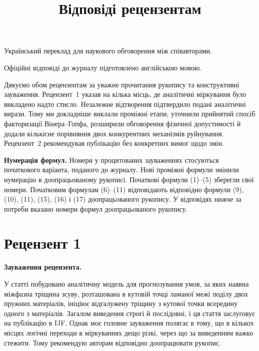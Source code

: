 \documentclass[11pt]{article}
\author{}
\date{}
\newenvironment{reviewcomment}{\def\FrameCommand{\textcolor{blue!45!black}{\vrule width 1.2pt}\hspace{9pt}}\MakeFramed{\advance\hsize-\width\FrameRestore}\noindent\textbf{Зауваження рецензента.}\par\smallskip\noindent}{\endMakeFramed}
\begin{document}
\title{Відповіді рецензентам}
\maketitle
\vspace{-2em}
\begin{center}
Український переклад для наукового обговорення між співавторами.\par
Офіційні відповіді до журналу підготовлено англійською мовою.
\end{center}
\bigskip

Дякуємо обом рецензентам за уважне прочитання рукопису та конструктивні зауваження. Рецензент~1 указав на кілька місць, де аналітичні міркування було викладено надто стисло. Незалежне відтворення підтвердило подані аналітичні вирази. Тому ми докладніше виклали проміжні етапи, уточнили прийнятий спосіб факторизації Вінера--Гопфа, розширили обговорення фізичної допустимості й додали кількісне порівняння двох конкурентних механізмів руйнування. Рецензент~2 рекомендував публікацію без конкретних вимог щодо змін.

\textbf{Нумерація формул.} Номери у процитованих зауваженнях стосуються початкового варіанта, поданого до журналу. Нові проміжні формули змінили нумерацію в доопрацьованому рукописі. Початкові формули (1)–(5) зберегли свої номери. Початковим формулам (6)–(11) відповідають відповідно формули (9), (10), (11), (15), (16) і (17) доопрацьованого рукопису. У відповідях нижче за потреби вказано номери формул доопрацьованого рукопису.

\section*{Рецензент 1}

\begin{reviewcomment}
У статті побудовано аналітичну модель для прогнозування умов, за яких наявна міжфазна тріщина зсуву, розташована в кутовій точці ламаної межі поділу двох пружних матеріалів, ініціює відгалужену тріщину з кутової точки всередину одного з матеріалів. Загалом виведення строгі й послідовні, і ця стаття заслуговує на публікацію в IJF. Однак моє головне зауваження полягає в тому, що в кількох місцях логічні переходи в міркуваннях дещо різкі, через що за виведенням важко стежити. Тому рекомендую авторам відповідно доопрацювати рукопис.
\end{reviewcomment}
\end{document}
